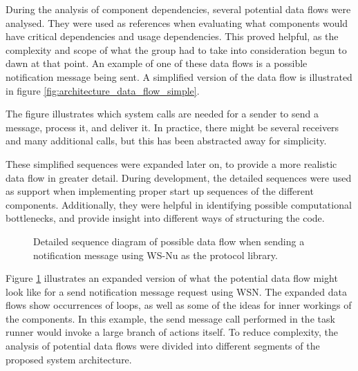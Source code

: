 During the analysis of component dependencies, several potential data flows were analysed. They were used as references when evaluating what components would have critical dependencies and usage dependencies. This proved helpful, as the complexity and scope of what the group had to take into consideration begun to dawn at that point. An example of one of these data flows is a possible notification message being sent. A simplified version of the data flow is illustrated in figure \ref{fig:architecture_data_flow_simple}.

The figure illustrates which system calls are needed for a sender to send a message, process it, and deliver it. In practice, there might be several receivers and many additional calls, but this has been abstracted away for simplicity.

These simplified sequences were expanded later on, to provide a more realistic data flow in greater detail. During development, the detailed sequences were used as support when implementing proper start up sequences of the different components. Additionally, they were helpful in identifying possible computational bottlenecks, and provide insight into different ways of structuring the code.

\clearpage

\begin{center}
  \begin{figure}[ht!]
    \caption{Detailed sequence diagram of possible data flow when sending a notification message using WS-Nu as the protocol library.}
    \label{fig:architecture_data_flow}
  \end{figure}
\end{center}
Figure \ref{fig:architecture_data_flow} illustrates an expanded version of what the potential data flow might look like for a send notification message request using WSN. The expanded data flows show occurrences of loops, as well as some of the ideas for inner workings of the components. In this example, the send message call performed in the task runner would invoke a large branch of actions itself. To reduce complexity, the analysis of potential data flows were divided into different segments of the proposed system architecture.


